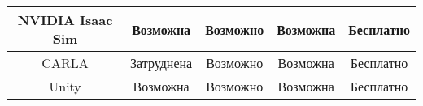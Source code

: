 \begin{landscape}
\begin{table}[h!]
\begin{tabular}{|c|c|c|c|c|}
        NVIDIA Isaac Sim  & Возможна                                                                    & Возможно                                                                       & Возможна                                                            & Бесплатно              \\ \hline
        CARLA             & Затруднена                                                                  & Возможно                                                                       & Возможна                                                            & Бесплатно              \\ \hline
        Unity             & Возможна                                                                    & Возможно                                                                       & Возможна                                                            & Бесплатно              \\ \hline
        \end{tabular}   %
    \end{table}

\end{landscape}
\clearpage



